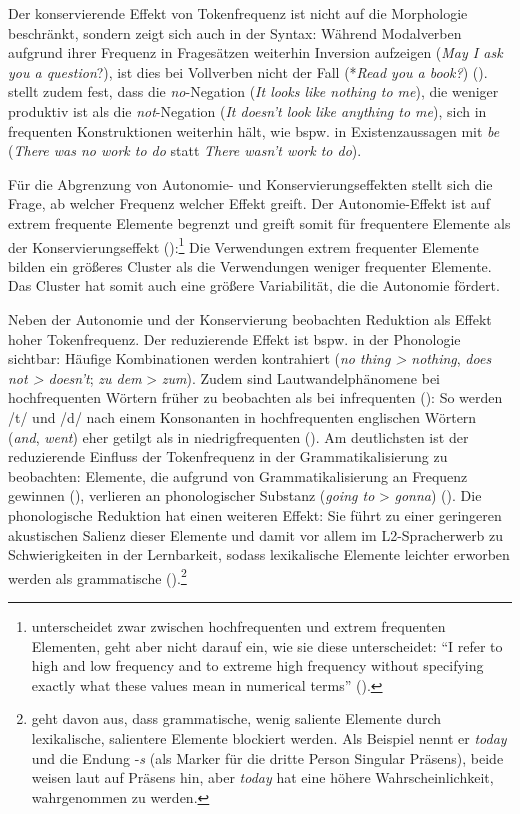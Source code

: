 Der konservierende Effekt von Tokenfrequenz ist nicht auf die Morphologie beschränkt, sondern zeigt sich auch in der Syntax: Während Modalverben aufgrund ihrer Frequenz in Fragesätzen weiterhin Inversion aufzeigen (\textit{May I ask you a question}?), ist dies bei Vollverben nicht der Fall (*\textit{Read you a book?}) (\cite[619--621]{Bybee.2002}). \textcite[728--729]{Bybee.2006b} stellt zudem fest, dass die \textit{no}-Negation (\textit{It looks like nothing to me}), die weniger produktiv ist als die \textit{not}-Negation (\textit{It doesn't look like anything to me}), sich in frequenten Konstruktionen weiterhin hält, wie bspw. in Existenzaussagen mit \textit{be} (\textit{There was no work to do} statt \textit{There wasn't work to do}). 



Für die Abgrenzung von Autonomie- und Konservierungseffekten stellt sich die Frage, ab welcher Frequenz welcher Effekt greift. Der Autonomie-Effekt ist auf extrem frequente Elemente begrenzt und greift somit für frequentere Elemente als der Konservierungseffekt (\cite[715]{Bybee.2006b}):\footnote{\textcite{Bybee.2006b} unterscheidet zwar zwischen hochfrequenten und extrem frequenten Elementen, geht aber nicht darauf ein, wie sie diese unterscheidet: "`I refer to high and low frequency and to extreme high frequency without specifying exactly what these values mean in numerical terms"' (\cite[715]{Bybee.2006b}).} Die Verwendungen extrem frequenter Elemente bilden ein größeres Cluster als die Verwendungen weniger frequenter Elemente. Das Cluster hat somit auch eine größere Variabilität, die die Autonomie fördert. 

Neben der Autonomie und der Konservierung be\-obachten \textcite[378--384]{Bybee.1997} Reduktion als Effekt hoher Tokenfrequenz. Der reduzierende Effekt  ist bspw. in der Phonologie sichtbar: Häufige Kombinationen werden kontrahiert (\textit{no thing > nothing}, \textit{does not > doesn't}; \textit{zu dem} > \textit{zum}). Zudem sind Lautwandelphänomene bei hochfrequenten Wörtern früher zu beobachten als bei infrequenten (\cite[46--47]{FenkOczlon.1990}): So werden /t/ und /d/ nach einem Konsonanten in hochfrequenten englischen Wörtern (\textit{and}, \textit{went}) eher getilgt als in niedrigfrequenten (\cite[69--71]{Bybee.2000}). Am deutlichsten ist der reduzierende Einfluss der Tokenfrequenz in der Grammatikalisierung zu beobachten: Elemente, die aufgrund von Grammatikalisierung an Frequenz gewinnen (\cite[188]{Detges.2002}), verlieren an phonologischer Substanz (\textit{going to} > \textit{gonna}) (\cite[378--380]{Bybee.1997}). Die phonologische Reduktion hat einen weiteren Effekt: Sie führt zu einer geringeren akustischen Salienz dieser Elemente und damit vor allem im L2-Spracherwerb zu Schwierigkeiten in der Lernbarkeit, sodass lexikalische Elemente leichter erworben werden als grammatische (\cite[236]{Ellis.2008}).\footnote{\textcite[307]{Ellis.2002} geht davon aus, dass grammatische, wenig saliente Elemente durch lexikalische, salientere Elemente blockiert werden. Als Beispiel nennt er \textit{today} und die Endung -\textit{s} (als Marker für die dritte Person Singular Präsens), beide weisen laut \textcite[307]{Ellis.2002} auf Präsens hin, aber \textit{today} hat eine höhere Wahrscheinlichkeit, wahrgenommen zu werden.} 


